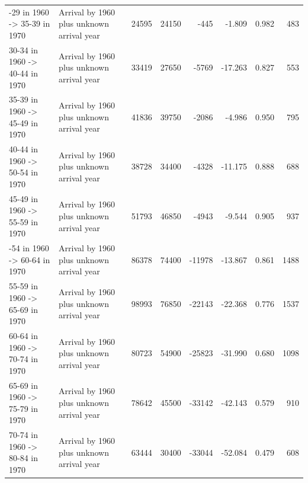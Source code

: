 \begin{table}
\begin{tabular}[t]{llrrrrrr}
\addlinespace
25-29 in 1960 -> 35-39 in 1970 & Arrival by 1960 plus unknown arrival year & 24595 & 24150 & -445 & -1.809 & 0.982 & 483\\
30-34 in 1960 -> 40-44 in 1970 & Arrival by 1960 plus unknown arrival year & 33419 & 27650 & -5769 & -17.263 & 0.827 & 553\\
35-39 in 1960 -> 45-49 in 1970 & Arrival by 1960 plus unknown arrival year & 41836 & 39750 & -2086 & -4.986 & 0.950 & 795\\
40-44 in 1960 -> 50-54 in 1970 & Arrival by 1960 plus unknown arrival year & 38728 & 34400 & -4328 & -11.175 & 0.888 & 688\\
45-49 in 1960 -> 55-59 in 1970 & Arrival by 1960 plus unknown arrival year & 51793 & 46850 & -4943 & -9.544 & 0.905 & 937\\
\addlinespace
50-54 in 1960 -> 60-64 in 1970 & Arrival by 1960 plus unknown arrival year & 86378 & 74400 & -11978 & -13.867 & 0.861 & 1488\\
55-59 in 1960 -> 65-69 in 1970 & Arrival by 1960 plus unknown arrival year & 98993 & 76850 & -22143 & -22.368 & 0.776 & 1537\\
60-64 in 1960 -> 70-74 in 1970 & Arrival by 1960 plus unknown arrival year & 80723 & 54900 & -25823 & -31.990 & 0.680 & 1098\\
65-69 in 1960 -> 75-79 in 1970 & Arrival by 1960 plus unknown arrival year & 78642 & 45500 & -33142 & -42.143 & 0.579 & 910\\
70-74 in 1960 -> 80-84 in 1970 & Arrival by 1960 plus unknown arrival year & 63444 & 30400 & -33044 & -52.084 & 0.479 & 608\\
\bottomrule
\end{tabular}
\end{table}
